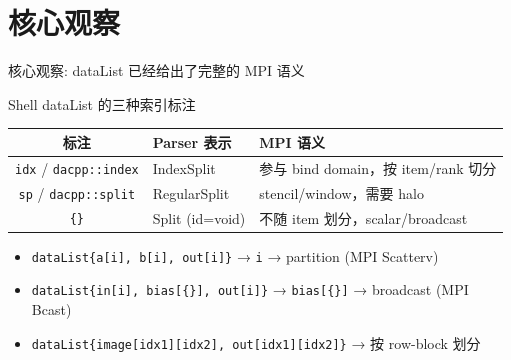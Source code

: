 \documentclass[aspectratio=169,10pt]{beamer}
\begin{document}
\section{核心观察}
\begin{frame}{核心观察: dataList 已经给出了完整的 MPI 语义}
\begin{block}{Shell dataList 的三种索引标注}
\begin{center}
\begin{tabular}{cll}
    \toprule
    标注 & Parser 表示 & MPI 语义 \\
    \midrule
    \texttt{idx} / \texttt{dacpp::index} & IndexSplit & 参与 bind domain，按 item/rank 切分 \\
    \texttt{sp} / \texttt{dacpp::split} & RegularSplit & stencil/window，需要 halo \\
    \texttt{\{\}} & Split (id=void) & 不随 item 划分，scalar/broadcast \\
    \bottomrule
\end{tabular}
\end{center}
\end{block}

\bigskip
\begin{examples}
\begin{itemize}
    \item \texttt{dataList\{a[i], b[i], out[i]\}} → \texttt{i} → partition (MPI Scatterv)
    \item \texttt{dataList\{in[i], bias[\{\}], out[i]\}} → \texttt{bias[\{\}]} → broadcast (MPI Bcast)
    \item \texttt{dataList\{image[idx1][idx2], out[idx1][idx2]\}} → 按 row-block 划分
\end{itemize}
\end{examples}
\end{frame}

\end{document}
